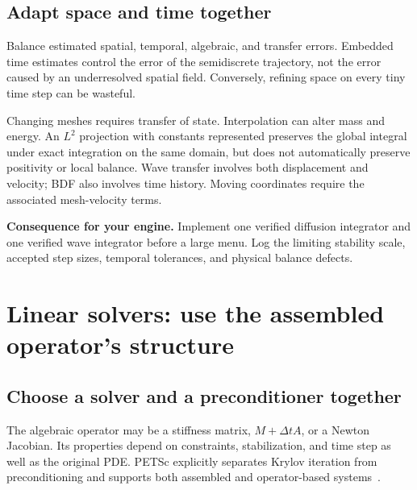 \documentclass[11pt,a4paper]{article}
\newcommand{\decision}[1]{\par\smallskip\noindent\textcolor{accent}{\textbf{Consequence for your engine.}} #1\par}
\begin{document}
\subsection{Adapt space and time together}
Balance estimated spatial, temporal, algebraic, and transfer errors. Embedded time estimates control the error of the semidiscrete trajectory, not the error caused by an underresolved spatial field. Conversely, refining space on every tiny time step can be wasteful.

Changing meshes requires transfer of state. Interpolation can alter mass and energy. An $L^2$ projection with constants represented preserves the global integral under exact integration on the same domain, but does not automatically preserve positivity or local balance. Wave transfer involves both displacement and velocity; BDF also involves time history. Moving coordinates require the associated mesh-velocity terms.

\decision{Implement one verified diffusion integrator and one verified wave integrator before a large menu. Log the limiting stability scale, accepted step sizes, temporal tolerances, and physical balance defects.}

\section{Linear solvers: use the assembled operator's structure}\label{sec:solvers}
\subsection{Choose a solver and a preconditioner together}
The algebraic operator may be a stiffness matrix, $M+\Delta t A$, or a Newton Jacobian. Its properties depend on constraints, stabilization, and time step as well as the original PDE. PETSc explicitly separates Krylov iteration from preconditioning and supports both assembled and operator-based systems~\cite{petscksp}.
\end{document}
